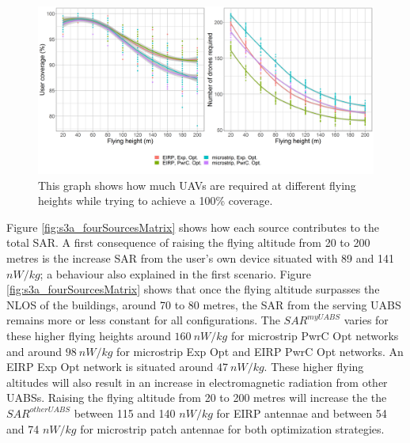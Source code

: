\documentclass[twocolumn]{phdsymp} %
\begin{document}
\begin{figure}[]
  \includegraphics[width=\linewidth]{../results/s3/fhvsnumdronesAndCov.png}
  \caption{This graph shows how much \acs{UAV}s are required at different flying heights while trying to achieve a 100\% coverage.}
  \label{fig:s3a_numDronesAndCov}
\end{figure}

Figure \ref{fig:s3a_fourSourcesMatrix} shows how each source contributes to the total \gls{SAR}.
A first consequence of raising the flying altitude from 
 20 to 200 metres is the increase \gls{SAR} from the user's own device situated
 with 89 and 141 $nW/kg$; a behaviour also explained in the first scenario.
Figure \ref{fig:s3a_fourSourcesMatrix} shows that once the flying altitude surpasses the \gls{NLOS} of the buildings, 
around 70 to 80 metres, the SAR from the serving \gls{UABS} remains 
more or less constant for all configurations.
The $SAR^{myUABS}$ varies for these higher flying heights 
around $160\ nW/kg$ for microstrip \gls{PwrC Opt} networks and around $98\ nW/kg$ for microstrip \gls{Exp Opt} and \gls{EIRP} \gls{PwrC Opt} networks.
An \gls{EIRP} \gls{Exp Opt} network is situated around $47\ nW/kg$.
These higher flying altitudes will also result in an increase in electromagnetic radiation from 
other \gls{UABS}s.
Raising the flying altitude from 20 to 200 metres will increase the
the $SAR^{otherUABS}$ between 115 and 140 $nW/kg$ for \gls{EIRP} antennae and between 54 and 74 $nW/kg$ for microstrip patch antennae
for both optimization strategies.
\end{document}
